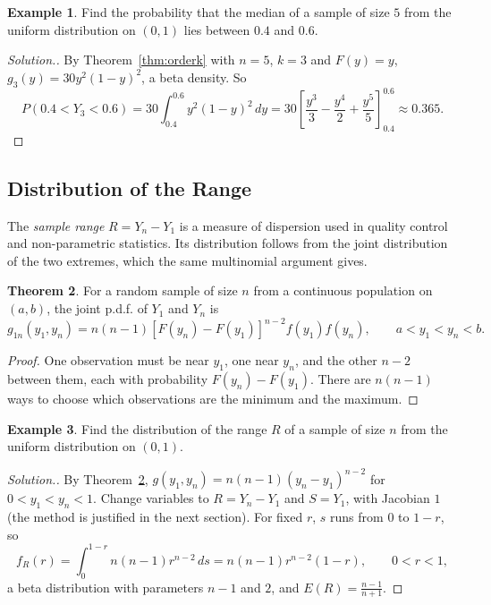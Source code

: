 \documentclass[12pt,a4paper]{report}
\theoremstyle{definition}
\newtheorem{thm}{Theorem}[section]
\newtheorem{example}[thm]{Example}
\theoremstyle{plain}
\newenvironment{solution}
  {\renewcommand{\qedsymbol}{}\begin{proof}[\textit{Solution}.]}
  {\end{proof}}
\begin{document}
\begin{example}
\label{ex:medianuniform}
Find the probability that the median of a sample of size $5$ from the uniform
distribution on $(0,1)$ lies between $0.4$ and $0.6$.
\end{example}

\begin{solution}
By Theorem~\ref{thm:orderk} with $n = 5$, $k = 3$ and $F(y) = y$,
$g_3(y) = 30y^2(1 - y)^2$, a beta density. So
\[P(0.4<Y_3<0.6) = 30\int_{0.4}^{0.6}y^2(1 - y)^2\,dy = 30\left[\frac{y^3}{3} -
\frac{y^4}{2} + \frac{y^5}{5}\right]_{0.4}^{0.6} \approx 0.365 .\]
\end{solution}

\subsection{Distribution of the Range}

The \emph{sample range} $R = Y_n - Y_1$ is a measure of dispersion used in
quality control and non-parametric statistics. Its distribution follows from the
joint distribution of the two extremes, which the same multinomial argument
gives.

\begin{thm}
\label{thm:extremesjoint}
For a random sample of size $n$ from a continuous population on $(a,b)$, the
joint p.d.f. of $Y_1$ and $Y_n$ is
\[ g_{1n}(y_1, y_n) = n(n-1) [F(y_n) - F(y_1)]^{n-2} f(y_1) f(y_n) ,\qquad a <
y_1 < y_n < b .\]
\end{thm}

\begin{proof}
One observation must be near $y_1$, one near $y_n$, and the other $n - 2$
between them, each with probability $F(y_n) - F(y_1)$. There are $n(n - 1)$
ways to choose which observations are the minimum and the maximum.
\end{proof}

\begin{example}
\label{ex:rangeuniform}
Find the distribution of the range $R$ of a sample of size $n$ from the uniform
distribution on $(0,1)$.
\end{example}

\begin{solution}
By Theorem~\ref{thm:extremesjoint}, $g(y_1,y_n) = n(n - 1)(y_n - y_1)^{n-2}$ for
$0<y_1<y_n<1$. Change variables to $R = Y_n - Y_1$ and $S = Y_1$, with Jacobian
$1$ (the method is justified in the next section). For fixed $r$, $s$ runs from
$0$ to $1 - r$, so
\[f_R(r) = \int_0^{1 - r}n(n - 1)r^{n-2}\,ds = n(n - 1)r^{n-2}(1 - r),\qquad
0<r<1 ,\]
a beta distribution with parameters $n - 1$ and $2$, and $E(R) = \frac{n -
1}{n + 1}$.
\end{solution}
\end{document}
